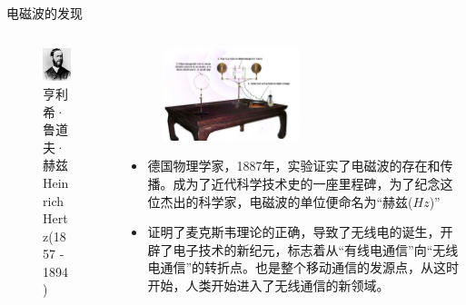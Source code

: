 \begin{frame}{电磁波的发现}
 \begin{columns}
  \begin{column}{0.35\linewidth}
   \begin{figure}
    \includegraphics[width=3.5cm]{Cha1//hertz.jpg}
    \caption{亨利希·鲁道夫·赫兹 Heinrich Hertz(1857 - 1894)}
   \end{figure}
  \end{column}
  \begin{column}{0.65\linewidth}
   \begin{figure}
    \flushright
    \includegraphics[width=4cm]{Cha1//HERTZ_TABLE.jpg}
   \end{figure}
   \begin{itemize}
    \item 德国物理学家，1887年，实验证实了电磁波的存在和传播。成为了近代科学技术史的一座里程碑，为了纪念这位杰出的科学家，电磁波的单位便命名为“赫兹($Hz$)”
    \item 证明了麦克斯韦理论的正确，导致了无线电的诞生，开辟了电子技术的新纪元，标志着从“有线电通信”向“无线电通信”的转折点。也是整个移动通信的发源点，从这时开始，人类开始进入了无线通信的新领域。
   \end{itemize}
  \end{column}
 \end{columns}
\end{frame}

